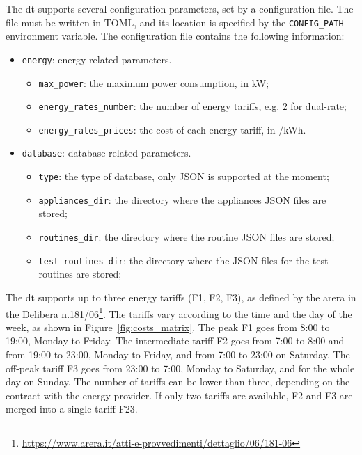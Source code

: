The \acrshort{dt} supports several configuration parameters, set by a configuration file. The file must be written in TOML, and its location is specified by the \texttt{CONFIG\_PATH} environment variable. The configuration file contains the following information:
\begin{itemize}
    \item \texttt{energy}: energy-related parameters.
          \begin{itemize}
              \item \texttt{max\_power}: the maximum power consumption, in kW;
              \item \texttt{energy\_rates\_number}: the number of energy tariffs, e.g. $2$ for dual-rate;
              \item \texttt{energy\_rates\_prices}: the cost of each energy tariff, in \texteuro/kWh.
          \end{itemize}
    \item \texttt{database}: database-related parameters.
          \begin{itemize}
              \item \texttt{type}: the type of database, only JSON is supported at the moment;
              \item \texttt{appliances\_dir}: the directory where the appliances JSON files are stored;
              \item \texttt{routines\_dir}: the directory where the routine JSON files are stored;
              \item \texttt{test\_routines\_dir}: the directory where the JSON files for the test routines are stored;
          \end{itemize}
\end{itemize}

The \acrshort{dt} supports up to three energy tariffs (F1, F2, F3), as defined by the \acrfull{arera} in the Delibera n.181/06\footnote{\url{https://www.arera.it/atti-e-provvedimenti/dettaglio/06/181-06}}. The tariffs vary according to the time and the day of the week, as shown in Figure~\ref{fig:costs_matrix}. The peak F1 goes from 8:00 to 19:00, Monday to Friday. The intermediate tariff F2 goes from 7:00 to 8:00 and from 19:00 to 23:00, Monday to Friday, and from 7:00 to 23:00 on Saturday. The off-peak tariff F3 goes from 23:00 to 7:00, Monday to Saturday, and for the whole day on Sunday. The number of tariffs can be lower than three, depending on the contract with the energy provider. If only two tariffs are available, F2 and F3 are merged into a single tariff F23.

